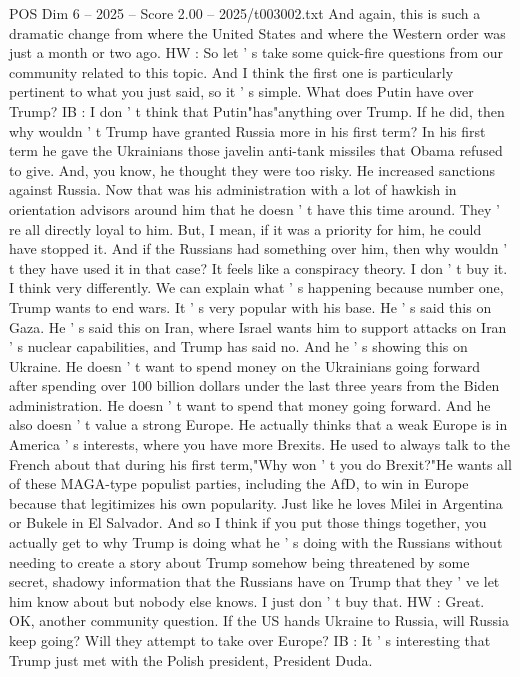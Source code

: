\begin{textsample}{POS Dim 6 – 2025 – Score 2.00 – 2025/t003002.txt}
And again, this is such a dramatic change from where the United States and where the Western order was just a month or two ago.
HW : So let ' s take some quick-fire questions from our community related to this topic.
And I think the first one is particularly pertinent to what you just said, so it ' s simple.
What does Putin have over Trump?
IB : I don ' t think that Putin"has"anything over Trump.
If he did, then why wouldn ' t Trump have granted Russia more in his first term?
In his first term he gave the Ukrainians those javelin anti-tank missiles that Obama refused to give.
And, you know, he thought they were too risky.
He increased sanctions against Russia.
Now that was his administration with a lot of hawkish in orientation advisors around him that he doesn ' t have this time around.
They ' re all directly loyal to him.
But, I mean, if it was a priority for him, he could have stopped it.
And if the Russians had something over him, then why wouldn ' t they have used it in that case?
It feels like a conspiracy theory.
I don ' t buy it.
I think very differently.
We can explain what ' s happening because number one, Trump wants to end wars.
It ' s very popular with his base.
He ' s said this on Gaza.
He ' s said this on Iran, where Israel wants him to support attacks on Iran ' s nuclear capabilities, and Trump has said no.
And he ' s showing this on Ukraine.
He doesn ' t want to spend money on the Ukrainians going forward after spending over 100 billion dollars under the last three years from the Biden administration.
He doesn ' t want to spend that money going forward.
And he also doesn ' t value a strong Europe.
He actually thinks that a weak Europe is in America ' s interests, where you have more Brexits.
He used to always talk to the French about that during his first term,"Why won ' t you do Brexit?"He wants all of these MAGA-type populist parties, including the AfD, to win in Europe because that legitimizes his own popularity.
Just like he loves Milei in Argentina or Bukele in El Salvador.
And so I think if you put those things together, you actually get to why Trump is doing what he ' s doing with the Russians without needing to create a story about Trump somehow being threatened by some secret, shadowy information that the Russians have on Trump that they ' ve let him know about but nobody else knows.
I just don ' t buy that.
HW : Great.
OK, another community question.
If the US hands Ukraine to Russia, will Russia keep going?
Will they attempt to take over Europe?
IB : It ' s interesting that Trump just met with the Polish president, President Duda.

\end{textsample}
